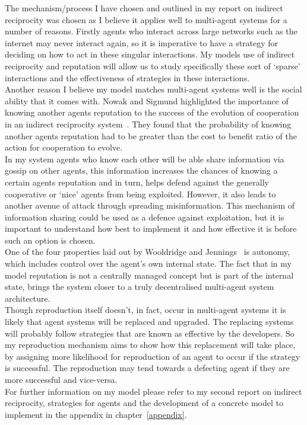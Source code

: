 \documentclass[]{final_report}
\begin{document}
The mechanism/process I have chosen and outlined in my report on indirect reciprocity was chosen as I believe it applies well to multi-agent systems for a number of reasons. Firstly agents who interact across large networks such as the internet may never interact again, so it is imperative to have a strategy for deciding on how to act in these singular interactions. My models use of indirect reciprocity and reputation will allow us to study specifically these sort of `sparse' interactions and the effectiveness of strategies in these interactions.\\
Another reason I believe my model matches multi-agent systems well is the social ability that it comes with. Nowak and Sigmund highlighted the importance of knowing another agents reputation to the success of the evolution of cooperation in an indirect reciprocity system~\cite{evol_indirect_image}. They found that the probability of knowing another agents reputation had to be greater than the cost to benefit ratio of the action for cooperation to evolve.\\
In my system agents who know each other will be able share information via gossip on other agents, this information increases the chances of knowing a certain agents reputation and in turn, helps defend against the generally cooperative or `nice' agents from being exploited. However, it also leads to another avenue of attack through spreading misinformation. This mechanism of information sharing could be used as a defence against exploitation, but it is important to understand how best to implement it and how effective it is before such an option is chosen.\\
One of the four properties laid out by Wooldridge and Jennings~\cite{wooldridge_jennings_1995} is autonomy, which includes control over the agent's own internal state. The fact that in my model reputation is not a centrally managed concept but is part of the internal state, brings the system closer to a truly decentralised multi-agent system architecture.\\
Though reproduction itself doesn't, in fact, occur in multi-agent systems it is likely that agent systems will be replaced and upgraded. The replacing systems will probably follow strategies that are known as effective by the developers. So my reproduction mechanism aims to show how this replacement will take place, by assigning more likelihood for reproduction of an agent to occur if the strategy is successful. The reproduction may tend towards a defecting agent if they are more successful and vice-versa.\\
For further information on my model please refer to my second report on indirect reciprocity, strategies for agents and the development of a concrete model to implement in the appendix in chapter~\ref{appendix}.
\end{document}
